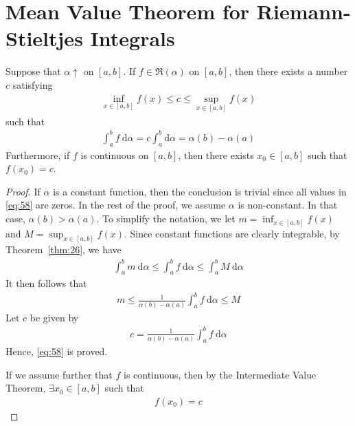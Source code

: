 \documentclass[thmcnt=section, 12pt]{elegantbook}
\begin{document}

\section{Mean Value Theorem for Riemann-Stieltjes Integrals}


\begin{theorem} \label{thm:27}
    Suppose that $\alpha \uparrow$ on $[a, b]$. If $f \in \mathfrak{R}(\alpha)$ on $[a, b]$, then there exists a number $c$ satisfying
    \begin{align*}
        \inf_{x \in [a, b]} f(x) \leq c \leq \sup_{x \in [a, b]} f (x)
    \end{align*}
    such that 
    \begin{align}
        \int_a^b f \ \mathrm{d}\alpha
        = c \int_{a}^{b} \mathrm{d}\alpha
        = \alpha(b) - \alpha(a)
        \label{eq:58}
    \end{align}
    Furthermore, if $f$ is continuous on $[a, b]$, then there exists $x_0 \in [a, b]$ such that $f(x_0) = c$.
\end{theorem}

\begin{proof}
    If $\alpha$ is a constant function, then the conclusion is trivial since all values in \eqref{eq:58} are zeros. In the rest of the proof, we assume $\alpha$ is non-constant. In that case, $\alpha(b) > \alpha(a)$. To simplify the notation, we let $m = \inf_{x \in [a, b]} f(x)$ and $M = \sup_{x \in [a, b]} f(x)$. Since constant functions are clearly integrable, by Theorem~\ref{thm:26}, we have 
    \begin{align*}
        \int_{a}^{b} m \ \mathrm{d}\alpha
        \leq \int_{a}^{b} f \ \mathrm{d}\alpha
        \leq \int_{a}^{b} M \ \mathrm{d}\alpha
    \end{align*}
    It then follows that 
    \begin{align*}
        m \leq \frac{1}{\alpha(b) - \alpha(a)} \int_{a}^{b} f \ \mathrm{d}\alpha \leq M
    \end{align*}
    Let $c$ be given by 
    \begin{align*}
        c = \frac{1}{\alpha(b) - \alpha(a)} \int_{a}^{b} f \ \mathrm{d}\alpha
    \end{align*}
    Hence, \eqref{eq:58} is proved.

    \par If we assume further that $f$ is continuous, then by the Intermediate Value Theorem, $\exists x_0 \in [a, b]$ such that
    \begin{align*}
        f(x_0) = c
    \end{align*}
\end{proof}
\end{document}
